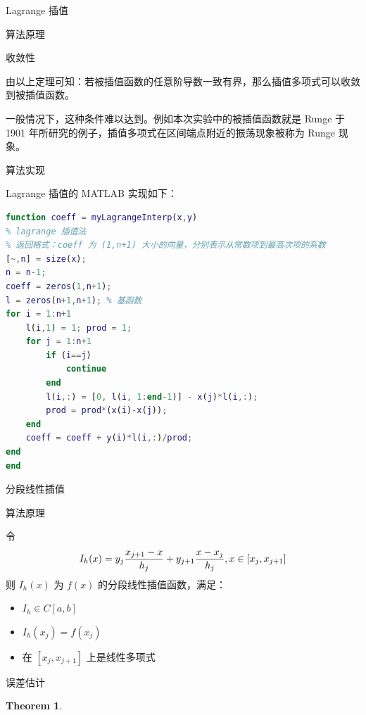 \documentclass[a4paper]{article}
\newtheorem{myThm}{Theorem}
\begin{document}
\begin{multicols}{2}
\begin{section}{Lagrange 插值}
\begin{subsection}{算法原理}
		\begin{subsubsection}{收敛性}
		
			由以上定理可知：若被插值函数的任意阶导数一致有界，那么插值多项式可以收敛到被插值函数。
			
			一般情况下，这种条件难以达到。例如本次实验中的被插值函数就是 Runge 于 1901 年所研究的例子，插值多项式在区间端点附近的振荡现象被称为 Runge 现象。
			
		\end{subsubsection}
		
	\end{subsection}

	\begin{subsection}{算法实现}
	
		Lagrange 插值的 MATLAB 实现如下：
		
		\begin{lstlisting}[language=Matlab]
function coeff = myLagrangeInterp(x,y)
% lagrange 插值法
% 返回格式：coeff 为 (1,n+1) 大小的向量，分别表示从常数项到最高次项的系数
[~,n] = size(x);
n = n-1;
coeff = zeros(1,n+1);
l = zeros(n+1,n+1); % 基函数
for i = 1:n+1
    l(i,1) = 1; prod = 1;
    for j = 1:n+1
        if (i==j)
            continue
        end
        l(i,:) = [0, l(i, 1:end-1)] - x(j)*l(i,:);  
        prod = prod*(x(i)-x(j));
    end
    coeff = coeff + y(i)*l(i,:)/prod;
end
end
		\end{lstlisting}

	\end{subsection}

\end{section}

\begin{section}{分段线性插值}
	
	\begin{subsection}{算法原理}
		
		令 $$I_h(x) = y_j {x_{j+1}-x\over h_j} + y_{j+1} {x-x_j\over h_j}, x\in [x_j, x_{j+1}]$$ 则 $I_h(x)$ 为 $f(x)$ 的分段线性插值函数，满足：
		
		\begin{itemize}
  			\item $I_h \in C[a,b]$
  			\item $I_h(x_j) = f(x_j)$
  			\item 在 $[x_j, x_{j+1}]$ 上是线性多项式
		\end{itemize}
		
		\begin{subsubsection}{误差估计}
			
			\begin{myThm}
				

\end{myThm}
\end{subsubsection}
\end{subsection}
\end{section}
\end{multicols}
\end{document}

